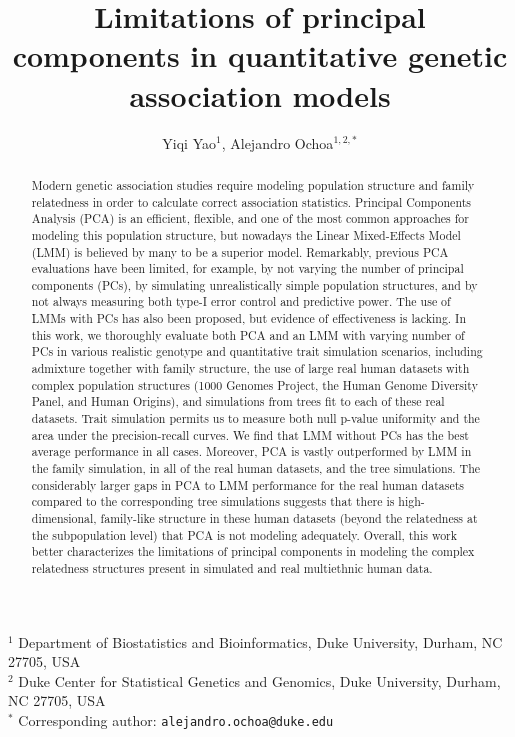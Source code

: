 \documentclass[11pt]{article}
\title{\Large \textbf{
    Limitations of principal components in quantitative genetic association models
  }}
\author{Yiqi Yao$^1$, Alejandro Ochoa$^{1,2,*}$}
\date{}
\begin{document}
\maketitle

\noindent
$^1$ Department of Biostatistics and Bioinformatics, Duke University, Durham, NC 27705, USA \\
$^2$ Duke Center for Statistical Genetics and Genomics, Duke University, Durham, NC 27705, USA \\
$^*$ Corresponding author: \texttt{alejandro.ochoa@duke.edu}


\begin{abstract}
  Modern genetic association studies require modeling population structure and family relatedness in order to calculate correct association statistics.
  Principal Components Analysis (PCA) is an efficient, flexible, and one of the most common approaches for modeling this population structure, but nowadays the Linear Mixed-Effects Model (LMM) is believed by many to be a superior model.
  Remarkably, previous PCA evaluations have been limited, for example, by not varying the number of principal components (PCs), by simulating unrealistically simple population structures, and by not always measuring both type-I error control and predictive power.
  The use of LMMs with PCs has also been proposed, but evidence of effectiveness is lacking.
  In this work, we thoroughly evaluate both PCA and an LMM with varying number of PCs in various realistic genotype and quantitative trait simulation scenarios, including admixture together with family structure, the use of large real human datasets with complex population structures (1000 Genomes Project, the Human Genome Diversity Panel, and Human Origins), and simulations from trees fit to each of these real datasets.
  Trait simulation permits us to measure both null p-value uniformity and the area under the precision-recall curves.
  We find that LMM without PCs has the best average performance in all cases.
  Moreover, PCA is vastly outperformed by LMM in the family simulation, in all of the real human datasets, and the tree simulations.
  The considerably larger gaps in PCA to LMM performance for the real human datasets compared to the corresponding tree simulations suggests that there is high-dimensional, family-like structure in these human datasets (beyond the relatedness at the subpopulation level) that PCA is not modeling adequately.
  Overall, this work better characterizes the limitations of principal components in modeling the complex relatedness structures present in simulated and real multiethnic human data.
\end{abstract}
\end{document}
